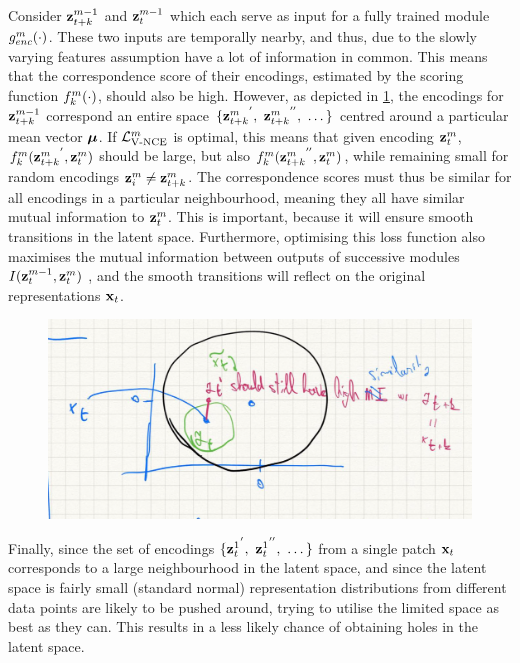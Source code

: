			Consider $\mathbf{z}_{t+k}^{m-1}$ and $\mathbf{z}_t^{m-1}$ which each serve as input for a fully trained module $g_{enc}^m(\cdot)$. These two inputs are temporally nearby, and thus, due to the slowly varying features assumption \cite{zhangSlowFeatureAnalysis2012} have a lot of information in common. This means that the correspondence score of their encodings, estimated by the scoring function $f_k^m(\cdot)$, should also be high. However, as depicted in \ref{fig:gaussian-neighbourhood}, the encodings for $\mathbf{z}_{t+k}^{m-1}$ correspond an entire space $ \{ {\mathbf{z}_{t+k}^m}^{'},~{\mathbf{z}_{t+k}^m}^{''},~\dots \}$ centred around a particular mean vector $\bm{\mu}$. If $\mathcal{L}_{\text{V-NCE}}^m$ is optimal, this means that given encoding $\mathbf{z}_t^m$, $f_k^m({\mathbf{z}_{t+k}^m}^{'}, {\mathbf{z}_t^m})$ should be  large, but also $f_k^m({\mathbf{z}_{t+k}^m}^{''}, {\mathbf{z}_t^m})$, while remaining small for random encodings $\mathbf{z}_i^m \neq \mathbf{z}_{t+k}^m$. The correspondence scores must thus be similar for all encodings in a particular neighbourhood, meaning they all have similar mutual information to $\mathbf{z}_t^{m}$. This is important, because it will ensure smooth transitions in the latent space. Furthermore, optimising this loss function also maximises the mutual information between outputs of successive modules $I(\mathbf{z}_t^{m-1}, \mathbf{z}_t^{m})$ \cite{lowePuttingEndEndtoEnd2020}, and the smooth transitions will reflect on the original representations $\mathbf{x}_t$.			 
		
		\begin{figure} %
			\centering
			\includegraphics[width=0.7\linewidth]{"gaussian neighbourhood"}
			\caption{}
			\label{fig:gaussian-neighbourhood}
		\end{figure}
		
			Finally, since the set of encodings $ \{ {\mathbf{z}_t^1}^{'},~{\mathbf{z}_t^1}^{''},~\dots \}$ from a single patch $\mathbf{x}_t$ corresponds to a large neighbourhood in the latent space, and since the latent space is fairly small (standard normal) representation distributions from different data points are likely to be pushed around, trying to utilise the limited space as best as they can. This results in a less likely chance of obtaining holes in the latent space.
			
